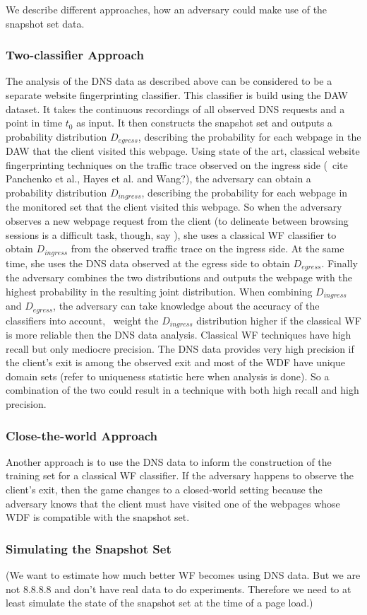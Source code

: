 We describe different approaches, how an adversary could make use of the
snapshot set data.

\subsubsection{Two-classifier Approach}

The analysis of the DNS data as described above can be considered to be
a separate website fingerprinting classifier. This classifier is build
using the DAW dataset. It takes the continuous recordings of all
observed DNS requests and a point in time $t_0$ as input. It then
constructs the snapshot set and outputs a probability distribution
$D_{egress}$, describing the probability for each webpage in the DAW
that the client visited this webpage.
%
Using state of the art, classical website fingerprinting techniques on
the traffic trace observed on the ingress side (\eg~cite Panchenko et al.,
Hayes et al. and Wang?), the adversary can obtain a probability distribution
$D_{ingress}$, describing the probability for each webpage in the
monitored set that the client visited this webpage. 
%
So when the adversary observes a new webpage request from the client 
(to delineate between browsing sessions is a difficult task, though, say
\cite{Coull2007a}), she uses a classical WF classifier to obtain $D_{ingress}$
from the observed traffic trace on the ingress side. At the same time,
she uses the DNS data observed at the egress side to obtain $D_{egress}$.
%
Finally the adversary combines the two distributions and outputs the 
webpage with the highest probability in the resulting joint distribution.
%
When combining $D_{ingress}$ and $D_{egress}$, the adversary can take
knowledge about the accuracy of the classifiers into account, \eg~weight
the $D_{ingress}$ distribution higher if the classical WF is more reliable
then the DNS data analysis.
%
Classical WF techniques have high recall but only mediocre precision.
The DNS data provides very high precision if the client's exit is among
the observed exit and most of the WDF have unique domain sets (refer to
uniqueness statistic here when analysis is done). So a combination of
the two could result in a technique with both high recall and high
precision.


\subsubsection{Close-the-world Approach}

Another approach is to use the DNS data to inform the construction
of the training set for a classical WF classifier.
%
If the adversary happens to observe the client's exit, then the game
changes to a closed-world setting because the adversary knows that the
client must have visited one of the webpages whose WDF is compatible 
with the snapshot set. 


\subsubsection{Simulating the Snapshot Set}
(We want to estimate how much better WF becomes using DNS data. But we
are not 8.8.8.8 and don't have real data to do experiments. Therefore we
need to at least simulate the state of the snapshot set at the time of a
page load.) %

